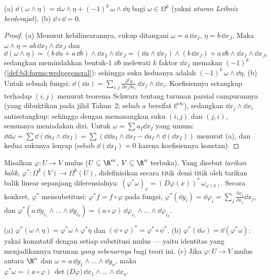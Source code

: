 \begin{theorem}\label{thm:b3:forms:dsquare}
(a) $\dd(\omega \wedge \eta) = \dd\omega \wedge \eta +
(-1)^k\,\omega \wedge \dd\eta$ bagi $\omega \in \Omega^k$
(yakni \emph{aturan Leibniz berderajat}).
(b) $\dd \circ \dd = 0$.
\end{theorem}

\begin{proof}
(a) Menurut kebilinearannya, cukup ditangani $\omega = a\,\dd
x_I$, $\eta = b\,\dd x_J$. Maka $\omega \wedge \eta =
ab\,\dd x_I \wedge \dd x_J$ dan
\[
\dd(\omega\wedge\eta) = (b\,\dd a + a\,\dd b) \wedge \dd x_I
\wedge \dd x_J
= (\dd a \wedge \dd x_I) \wedge (b\,\dd x_J) +
a\,\dd b \wedge \dd x_I \wedge \dd x_J,
\]
sedangkan memindahkan bentuk-$1$ $\dd b$ melewati $k$ faktor $\dd
x_I$ memakan $(-1)^k$ (\cref{def:b3:forms:wedgegeneral}): sehingga
suku keduanya adalah $(-1)^k\,\omega \wedge \dd\eta$.
(b) Untuk sebuah fungsi: $\dd(\dd a) = \sum_{i,j}
\frac{\partial^2a}{\partial x_j\partial x_i}\,\dd x_j \wedge
\dd x_i$. Koefisiennya setangkup terhadap $(i,j)$ menurut
teorema Schwarz tentang turunan parsial campurannya (yang dibuktikan pada jilid
Tahun~2; sebab $a$ bersifat $\mathcal C^\infty$), sedangkan $\dd x_j \wedge
\dd x_i$ antisetangkup: sehingga dengan memasangkan suku $(i,j)$ dan
$(j,i)$, semuanya meniadakan diri. Untuk $\omega = \sum
a_I\dd x_I$ yang umum: $\dd\dd\omega = \sum\dd(\dd a_I \wedge \dd x_I)
= \sum(\dd\dd a_I\wedge\dd x_I - \dd a_I\wedge\dd(\dd x_I))$
menurut (a), dan kedua sukunya lenyap (sebab $\dd(\dd x_I) = 0$ karena
koefisiennya konstan).
\end{proof}

\begin{definition}\label{def:b3:forms:pullback}
Misalkan $\varphi\colon U \to V$ mulus ($U \subseteq \R^m$,
$V \subseteq \R^n$ terbuka). Yang disebut \emph{tarikan balik},
$\varphi^*\colon \Omega^k(V) \to \Omega^k(U)$, didefinisikan
secara titik demi titik oleh tarikan balik linear sepanjang diferensialnya:
$(\varphi^*\omega)_x = (D\varphi(x))^*\,\omega_{\varphi(x)}$.
Secara konkret, $\varphi^*$ mensubstitusi: $\varphi^*f = f \circ
\varphi$ pada fungsi, $\varphi^*(\dd y_i) =
\dd\varphi_i = \sum_j\frac{\partial\varphi_i}{\partial
x_j}\dd x_j$, dan $\varphi^*(a\,\dd y_{i_1}\wedge\dots\wedge
\dd y_{i_k}) =
(a\circ\varphi)\,\dd\varphi_{i_1}\wedge\dots\wedge
\dd\varphi_{i_k}$.
\end{definition}

\begin{theorem}\label{thm:b3:forms:pullback}
(a) $\varphi^*(\omega \wedge \eta) = \varphi^*\omega \wedge
\varphi^*\eta$ dan $(\psi \circ \varphi)^* = \varphi^* \circ
\psi^*$.
(b) $\varphi^*(\dd\omega) = \dd(\varphi^*\omega)$: yakni
 komutatif dengan setiap substitusi mulus
--- yaitu identitas yang menjadikannya turunan \emph{yang sebenarnya}
bagi teori ini.
(c) Jika $\varphi\colon U \to V$ mulus antara 
$\R^n$ dan $\omega = a\,\dd y_1 \wedge \dots \wedge \dd
y_n$, maka $\varphi^*\omega = (a \circ
\varphi)\,\det\bigl(D\varphi\bigr)\,\dd x_1 \wedge \dots
\wedge \dd x_n$.
\end{theorem}

